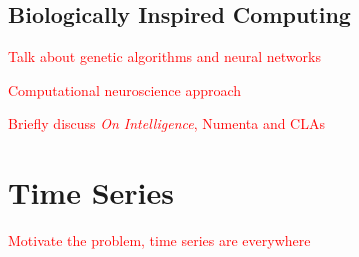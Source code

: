 \documentclass[oneside,12pt,openany]{book}
\begin{document}
	\section{Biologically Inspired Computing}
	
	\textcolor{red}{Talk about genetic algorithms and neural networks}
	
	\textcolor{red}{Computational neuroscience approach}
	
	\textcolor{red}{Briefly discuss \textit{On Intelligence}, Numenta and CLAs}
	
	\chapter{Time Series}
	
	\textcolor{red}{Motivate the problem, time series are everywhere}
	
\end{document}
